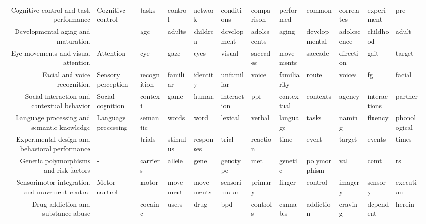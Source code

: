 \documentclass[english]{article}
\begin{document}
\begin{landscape}
\begin{center}
  \begin{supertabular}{rlllllllllll}
  Cognitive control and task performance &   Cognitive control &            tasks &       control &         network &     conditions &  comparison &      performed &        common &     correlates &    experiment &            pre \\
  Developmental aging and maturation &                   - &              age &        adults &        children &    development & adolescents &          aging & developmental &    adolescence &     childhood &          adult \\
  Eye movements and visual attention &           Attention &              eye &          gaze &            eyes &         visual &    saccades &      movements &       saccade &      direction &          gait &         target \\
        Facial and voice recognition &  Sensory perception &      recognition &      familiar &        identity &     unfamiliar &       voice &    familiarity &         route &         voices &            fg &         facial \\
Social interaction and contextual behavior &    Social cognition &          context &          game &           human &    interaction &         ppi &     contextual &      contexts &         agency &  interactions &        partner \\
Language processing and semantic knowledge & Language processing &         semantic &         words &            word &        lexical &      verbal &       language &         tasks &         naming &       fluency &   phonological \\
Experimental design and behavioral performance &                   - &           trials &      stimulus &       responses &          trial &    reaction &           time &         event &         target &        events &          times \\
Genetic polymorphisms and risk factors &                   - &         carriers &        allele &            gene &       genotype &         met &        genetic &  polymorphism &            val &          comt &             rs \\
Sensorimotor integration and movement control &       Motor control &            motor &      movement &       movements &   sensorimotor &     primary &         finger &       control &        imagery &       sensory &      execution \\
  Drug addiction and substance abuse &                   - &          cocaine &         users &            drug &            bpd &    controls &       cannabis &     addiction &        craving &     dependent &         heroin \\

\end{supertabular}
\end{center}
\end{landscape}
\end{document}
